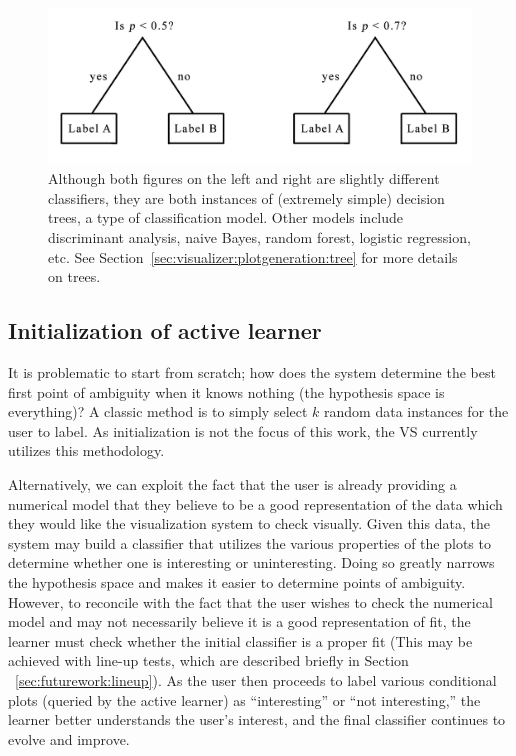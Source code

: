\begin{figure}[htb]
	\begin{center}
		\includegraphics[width=0.75\linewidth]{ch-visualizer/figures/tree}
		\caption[Classifiers and classification models]{Although both figures 
		on the left and right are slightly different classifiers, they 
		are both instances of (extremely simple) decision trees, a type of 
		classification model. Other models include discriminant analysis, naive 
		Bayes, random forest, logistic regression, etc. 
		See Section~\ref{sec:visualizer:plotgeneration:tree} for more details 
		on trees.}
		\label{fig:visualizer:al:tree}
	\end{center}
\end{figure}

\subsection{Initialization of active learner}
\label{sec:visualizer:al:initialization}

It is problematic to start from scratch; how does the system determine
the best first point of ambiguity when it knows nothing (the hypothesis space is
everything)? A classic method is to simply select $k$ random data instances for 
the user to label. As initialization is not the focus of this work, the VS 
currently utilizes this methodology.

Alternatively, we can exploit the fact that the
user is already providing a numerical model that they believe to be a good
representation of the data which they would like the visualization system to
check visually. Given this data, the system may build a classifier that utilizes
the various properties of the plots to determine whether one is interesting or
uninteresting. Doing so greatly narrows the hypothesis space and makes it easier
to determine points of ambiguity. However, to reconcile with the fact that the
user wishes to check the numerical model and may not necessarily believe it is a
good representation of fit, the learner must check whether the initial 
classifier is a proper fit (This may be achieved with line-up tests, which are 
described briefly in Section ~\ref{sec:futurework:lineup}). As the user then 
proceeds to label various conditional plots (queried by the active learner) as 
``interesting'' or ``not interesting,'' the learner better understands the
user’s interest, and the final classifier continues to evolve and improve.

